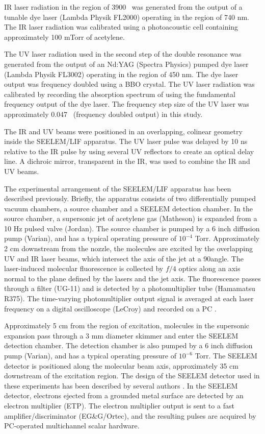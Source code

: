 \documentclass[12pt]{mitthesis}
\begin{document}
IR laser radiation in the region of 3900 \rcm\ was generated from the
output of a tunable dye laser (Lambda Physik FL2000) operating in the
region of 740 nm.    The IR laser radiation was
calibrated using a photoacoustic cell containing approximately 100
mTorr of acetylene.

The UV laser radiation used in the second step of the double resonance
was generated from the output of an Nd:YAG (Spectra Physics) pumped
dye laser (Lambda Physik FL3002) operating in the region of 450 nm.
The dye laser output was frequency doubled using a BBO crystal.  The
UV laser radiation was calibrated by recording the absorption spectrum
of  using the fundamental frequency output of the dye laser.
The frequency step size of the UV laser was approximately 0.047 \rcm\
(frequency doubled output) in this study.

The IR and UV beams were positioned in an overlapping, colinear
geometry inside the SEELEM/LIF apparatus.  The UV laser pulse was
delayed by 10 ns relative to the IR pulse by using several UV
reflectors to create an optical delay line.  A dichroic mirror,
transparent in the IR, was used to combine the IR and UV beams.

The experimental arrangement of the SEELEM/LIF apparatus has been
described previously.  \TODO{Cite.}  Briefly, the apparatus consists
of two differentially pumped vacuum chambers, a source chamber and a
SEELEM detection chamber.  In the source chamber, a supersonic jet of
acetylene gas (Matheson) is expanded from a 10 Hz pulsed valve
(Jordan).  The source chamber is pumped by a 6 inch diffusion pump
(Varian), and has a typical operating pressure of $10^{-4}$ Torr.
Approximately 2 cm downstream from the nozzle, the molecules are
excited by the overlapping UV and IR laser beams, which intersect the
axis of the jet at a 90\degrees angle.  The laser-induced molecular
fluorescence is collected by $f/4$ optics along an axis normal to the
plane defined by the lasers and the jet axis.  The fluorescence passes
through a filter (UG-11) and is detected by a photomultiplier tube
(Hamamatsu R375).  The time-varying photomultiplier output signal is
averaged at each laser frequency on a digital oscilloscope (LeCroy)
and recorded on a PC \TODO{Determine how many bits the scope has}.

Approximately 5 cm from the region of excitation, molecules in the
supersonic expansion pass through a 3 mm diameter skimmer and enter
the SEELEM detection chamber.  The detection chamber is also pumped by
a 6 inch diffusion pump (Varian), and has a typical operating pressure
of $10^{-6}$ Torr.  The SEELEM detector is positioned along the
molecular beam axis, approximately 35 cm downstream of the excitation
region.  The design of the SEELEM detector used in these experiments
has been described by several authors \TODO{cite}.  In the SEELEM
detector, electrons ejected from a grounded metal surface are detected
by an electron multiplier (ETP).  The electron multiplier output is
sent to a fast amplifier/discriminator (EG\&G/Ortec), and the
resulting pulses are acquired by PC-operated multichannel scalar
hardware.
\end{document}
